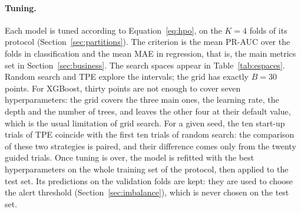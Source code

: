 \documentclass[11pt,a4paper]{article}
\theoremstyle{definition}
\begin{document}
\paragraph{Tuning.} Each model is tuned according to Equation~\eqref{eq:hpo}, on the $K = 4$ folds of its protocol (Section~\ref{sec:partitions}). The criterion is the mean PR-AUC over the folds in classification and the mean MAE in regression, that is, the main metrics set in Section~\ref{sec:business}. The search spaces appear in Table~\ref{tab:espaces}. Random search and TPE explore the intervals; the grid has exactly $B = 30$ points. For XGBoost, thirty points are not enough to cover seven hyperparameters: the grid covers the three main ones, the learning rate, the depth and the number of trees, and leaves the other four at their default value, which is the usual limitation of grid search. For a given seed, the ten start-up trials of TPE coincide with the first ten trials of random search: the comparison of these two strategies is paired, and their difference comes only from the twenty guided trials. Once tuning is over, the model is refitted with the best hyperparameters on the whole training set of the protocol, then applied to the test set. Its predictions on the validation folds are kept: they are used to choose the alert threshold (Section~\ref{sec:imbalance}), which is never chosen on the test set.
\end{document}
